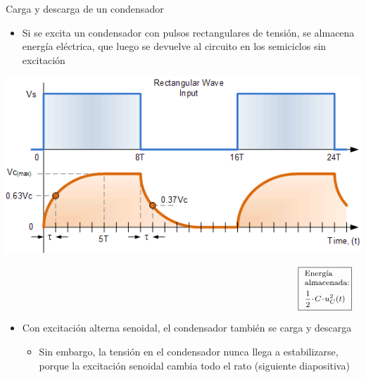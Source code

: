 \documentclass[aspectratio=169, usenames,svgnames,dvipsnames]{beamer}
\begin{document}
\begin{frame}{Carga y descarga de un condensador}  

\vspace{2mm}
    \begin{itemize}
        \item Si se excita un condensador con pulsos rectangulares de tensión, se \alert{almacena energía eléctrica, que luego se devuelve al circuito} en los semiciclos sin excitación
        \vspace{0.5mm}
    \end{itemize}
    
    \hspace{20mm}\includegraphics[width=0.62\linewidth]{../figs/charging_discharging_capacitor_pulses.png} 
    
    \vspace{-30mm}
    \[
        \qquad\qquad\qquad\qquad\qquad\qquad\qquad\qquad\qquad\qquad\qquad\qquad\qquad\qquad\quad\boxed{\text{ \begin{minipage}{0.12\linewidth} \footnotesize Energía \\ almacenada: \\[5pt] $\frac{1}{2}\cdot C\cdot u_C^2(t)$ \end{minipage} } }
    \]

    \vspace{6mm}
    \begin{itemize}
      \item Con \alert{excitación alterna senoidal}, el condensador también se carga y descarga

      \vspace{1mm}
        \begin{itemize}
            \item {\normalsize Sin embargo, la tensión en el condensador nunca llega a estabilizarse, porque la excitación senoidal cambia todo el rato \hspace{3mm}(siguiente diapositiva)}
        \end{itemize}
    \end{itemize}
\end{frame}
\end{document}
